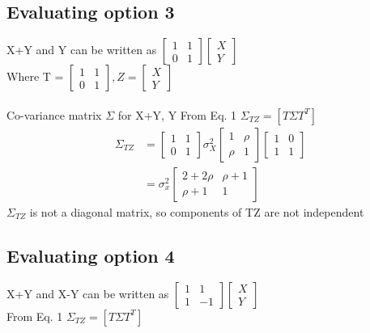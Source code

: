 \documentclass[journal,12pt,twocolumn]{IEEEtran}
\begin{document}
\subsection{Evaluating option 3}
X+Y and Y can be written as $\begin{bmatrix}
    1 & 1 \\
    0 & 1
\end{bmatrix} 
\begin{bmatrix}
    X \\
    Y
\end{bmatrix}$\\
Where T = $\begin{bmatrix}
    1 & 1 \\
    0 & 1
\end{bmatrix}, Z = \begin{bmatrix}
   X \\
   Y
\end{bmatrix}$\\
\\
Co-variance matrix $\Sigma$ for X+Y, Y
From Eq. 1 $\Sigma_{TZ} = [T\Sigma T^T]$\\
\begin{align*}
\Sigma_{TZ} &= \begin{bmatrix}
   1   &   1\\
   0   &   1
\end{bmatrix} \sigma_X^2 
\begin{bmatrix}
   1    & \rho \\
   \rho &  1 
\end{bmatrix}
\begin{bmatrix}
   1   &   0\\
   1   &   1
\end{bmatrix}\\
& = \sigma_x^2
\begin{bmatrix}
   2 + 2\rho   &  \rho + 1\\
   \rho + 1    &   1
\end{bmatrix}
\end{align*}
$\Sigma_{TZ}$ is not a diagonal matrix, so components of TZ are not independent

\subsection{Evaluating option 4}
X+Y and X-Y can be written as 
$\begin{bmatrix}
    1 &  1 \\
    1 & -1
\end{bmatrix} 
\begin{bmatrix}
    X \\
    Y
\end{bmatrix}$\\
From Eq. 1 $\Sigma_{TZ} = [T\Sigma T^T]$
\end{document}
